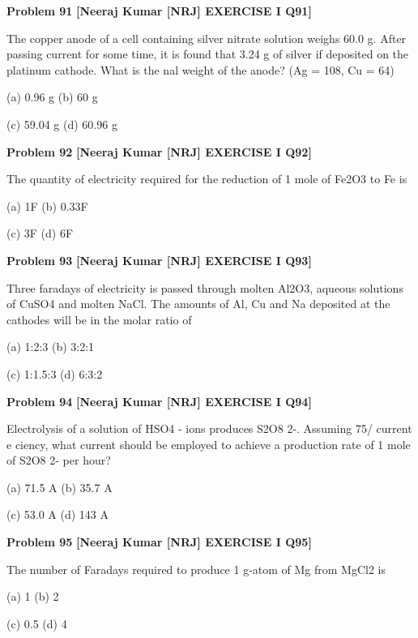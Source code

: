 \begin{problembox}
\textbf{Problem 91} \hfill \textbf{[Neeraj Kumar [NRJ] EXERCISE I Q91]}
\label{q:ext-nrj_all_questions-91}

The copper anode of a cell containing silver nitrate 
solution weighs 60.0 g. After passing current 
for some time, it is found that 3.24 g of silver if 
deposited on the platinum cathode. What is the 
  nal weight of the anode? (Ag = 108, Cu = 64)
 
 (a) 0.96 g 
(b) 60 g
 
 (c) 59.04 g 
(d) 60.96 g
\end{problembox}

\begin{problembox}
\textbf{Problem 92} \hfill \textbf{[Neeraj Kumar [NRJ] EXERCISE I Q92]}
\label{q:ext-nrj_all_questions-92}

The quantity of electricity required for the 
reduction of 1 mole of Fe2O3 to Fe is
 
 (a) 1F 
(b) 0.33F
 
 (c) 3F 
(d) 6F
\end{problembox}

\begin{problembox}
\textbf{Problem 93} \hfill \textbf{[Neeraj Kumar [NRJ] EXERCISE I Q93]}
\label{q:ext-nrj_all_questions-93}

Three faradays of electricity is passed through molten 
Al2O3, aqueous solutions of CuSO4 and molten 
NaCl. The amounts of Al, Cu and Na deposited at 
the cathodes will be in the molar ratio of
 
 (a) 1:2:3 
(b) 3:2:1
 
 (c) 1:1.5:3 
(d) 6:3:2
\end{problembox}

\begin{problembox}
\textbf{Problem 94} \hfill \textbf{[Neeraj Kumar [NRJ] EXERCISE I Q94]}
\label{q:ext-nrj_all_questions-94}

Electrolysis of a solution of HSO4
- ions produces 
S2O8
2-. 
Assuming 
75/%
current 
e   ciency, 
what current should be employed to achieve a 
production rate of 1 mole of S2O8
2- per hour?
 
 (a) 71.5 A 
(b) 35.7 A
 
 (c) 53.0 A 
(d) 143 A
\end{problembox}

\begin{problembox}
\textbf{Problem 95} \hfill \textbf{[Neeraj Kumar [NRJ] EXERCISE I Q95]}
\label{q:ext-nrj_all_questions-95}

The number of Faradays required to produce 
1 g-atom of Mg from MgCl2 is
 
 (a) 1 
(b) 2
 
 (c) 0.5 
(d) 4
\end{problembox}

